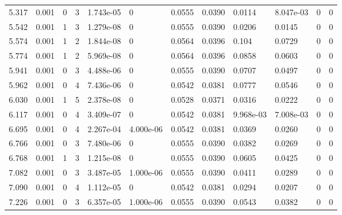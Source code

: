 \documentclass[preview]{standalone}
\begin{document}
{{\begin{tabular}{L{1.2cm}C{1.2cm} C{0.3cm}C{0.5cm} C{1.4cm}C{1.4cm} C{1.4cm}C{1.4cm} C{1.6cm}C{1.6cm} C{1.6cm}C{1.6cm}}
  5.317  &  0.001  & 0     &  3 &  1.743e-05  & 0  &  0.0555&   0.0390& 0.0114 & 8.047e-03   &  0 & 0  \\ 
  5.542  &  0.001  & 1     &  3 &  1.279e-08  & 0  &  0.0555&   0.0390& 0.0206 & 0.0145   &  0 & 0  \\ 
  5.574  &  0.001  & 1     &  2 &  1.844e-08  & 0  &  0.0564&   0.0396& 0.104 & 0.0729   &  0 & 0  \\ 
  5.774  &  0.001  & 1     &  2 &  5.969e-08  & 0  &  0.0564&   0.0396& 0.0858 & 0.0603   &  0 & 0  \\ 
  5.941  &  0.001  & 0     &  3 &  4.488e-06  & 0  &  0.0555&   0.0390& 0.0707 & 0.0497   &  0 & 0  \\ 
  5.962  &  0.001  & 0     &  4 &  7.436e-06  & 0  &  0.0542&   0.0381& 0.0777 & 0.0546   &  0 & 0  \\ 
  6.030  &  0.001  & 1     &  5 &  2.378e-08  & 0  &  0.0528&   0.0371& 0.0316 & 0.0222   &  0 & 0  \\ 
  6.117  &  0.001  & 0     &  4 &  3.409e-07  & 0  &  0.0542&   0.0381& 9.968e-03 & 7.008e-03   &  0 & 0  \\ 
  6.695  &  0.001  & 0     &  4 &  2.267e-04  & 4.000e-06  &  0.0542&   0.0381& 0.0369 & 0.0260   &  0 & 0  \\ 
  6.766  &  0.001  & 0     &  3 &  7.480e-06  & 0  &  0.0555&   0.0390& 0.0382 & 0.0269   &  0 & 0  \\ 
  6.768  &  0.001  & 1     &  3 &  1.215e-08  & 0  &  0.0555&   0.0390& 0.0605 & 0.0425   &  0 & 0  \\ 
  7.082  &  0.001  & 0     &  3 &  3.487e-05  & 1.000e-06  &  0.0555&   0.0390& 0.0411 & 0.0289   &  0 & 0  \\ 
  7.090  &  0.001  & 0     &  4 &  1.112e-05  & 0  &  0.0542&   0.0381& 0.0294 & 0.0207   &  0 & 0  \\ 
  7.226  &  0.001  & 0     &  3 &  6.357e-05  & 1.000e-06  &  0.0555&   0.0390& 0.0543 & 0.0382   &  0 & 0  \\ 
\hline 
\end{tabular} 

}}
\end{document}
